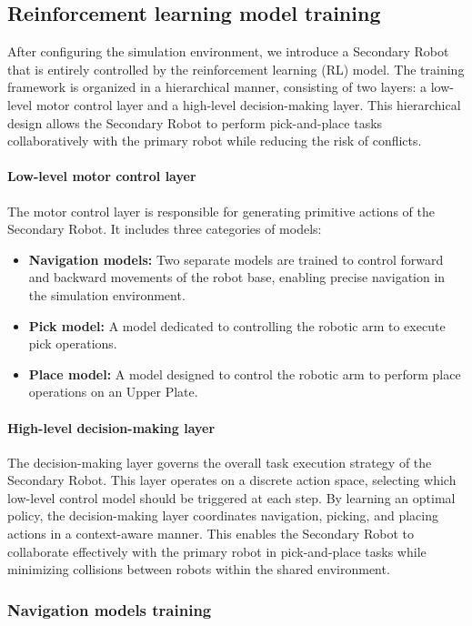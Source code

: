 \documentclass[english, 12pt, a4paper, elec, utf8, a-2b, online]{aaltothesis}
\begin{document}
\subsection{Reinforcement learning model training}

After configuring the simulation environment, we introduce a Secondary Robot that is entirely controlled by the reinforcement learning (RL) model. The training framework is organized in a hierarchical manner, consisting of two layers: a low-level motor control layer and a high-level decision-making layer. This hierarchical design allows the Secondary Robot to perform pick-and-place tasks collaboratively with the primary robot while reducing the risk of conflicts. 

\paragraph{Low-level motor control layer}
The motor control layer is responsible for generating primitive actions of the Secondary Robot. It includes three categories of models:
\begin{itemize}
    \item \textbf{Navigation models:} Two separate models are trained to control forward and backward movements of the robot base, enabling precise navigation in the simulation environment.
    \item \textbf{Pick model:} A model dedicated to controlling the robotic arm to execute pick operations.
    \item \textbf{Place model:} A model designed to control the robotic arm to perform place operations on an Upper Plate.
\end{itemize}

\paragraph{High-level decision-making layer}
The decision-making layer governs the overall task execution strategy of the Secondary Robot. This layer operates on a discrete action space, selecting which low-level control model should be triggered at each step. By learning an optimal policy, the decision-making layer coordinates navigation, picking, and placing actions in a context-aware manner. This enables the Secondary Robot to collaborate effectively with the primary robot in pick-and-place tasks while minimizing collisions between robots within the shared environment.

\subsubsection{Navigation models training}
\end{document}
